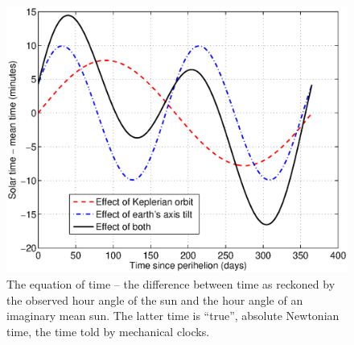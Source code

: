 \documentclass[12pt]{article}
\begin{document}
\begin{figure}[ht!]
\centering
\includegraphics[width=13cm]{figs/figure6.eps}
\caption{The equation of time -- the difference between time as reckoned by the observed hour angle of the sun and the hour angle of an imaginary mean sun. The latter time is ``true'', absolute Newtonian time, the time told by mechanical clocks.\label{EOT}}
\end{figure}
%
\end{document}

